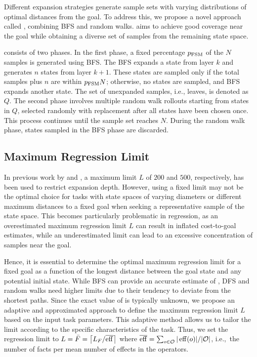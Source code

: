 \documentclass[ppgc,diss,english]{iiufrgs}
\providecommand{\ceil}[1]{\ensuremath{\left\lceil #1\right\rceil}}
\newcommand{\ppi}[2][inline]{\todo[color=purple!50,linecolor={purple!100},#1,fancyline,author=Pedro]{#2}}
\begin{document}
Different expansion strategies generate sample sets with varying distributions of optimal distances from the goal. To address this, we propose a novel approach called \bfsrw, combining BFS and random walks. \bfsrw aims to achieve good coverage near the goal while obtaining a diverse set of samples from the remaining state space.

\bfsrw consists of two phases. In the first phase, a fixed percentage $p_\text{FSM}$ of the $N$ samples is generated using BFS. The BFS expands a state from layer $k$ and generates $n$ states from layer $k+1$. These states are sampled only if the total samples plus $n$ are within $p_{\text{FSM}}N$; otherwise, no states are sampled, and BFS expands another state. The set of unexpanded samples, i.e., leaves, is denoted as $Q$. The second phase involves multiple random walk rollouts starting from states in $Q$, selected randomly with replacement after all states have been chosen once. This process continues until the sample set reaches $N$. During the random walk phase, states sampled in the BFS phase are discarded.

\ppi{Add pseudocode.}

\subsection{Maximum Regression Limit}

In previous work by \citet{Yu.etal/2020} and \citet{OToole/2022}, a maximum limit $L$ of $200$ and $500$, respectively, has been used to restrict expansion depth. However, using a fixed limit may not be the optimal choice for tasks with state spaces of varying diameters or different maximum distances to a fixed goal when seeking a representative sample of the state space. This becomes particularly problematic in regression, as an overestimated maximum regression limit $L$ can result in inflated cost-to-goal estimates, while an underestimated limit can lead to an excessive concentration of samples near the goal.

Hence, it is essential to determine the optimal maximum regression limit for a fixed goal as a function of the longest distance \distfarthest between the goal state and any potential initial state. While BFS can provide an accurate estimate of \distfarthest, DFS and random walks need higher limits due to their tendency to deviate from the shortest paths. Since the exact value of \distfarthest is typically unknown, we propose an adaptive and approximated approach to define the maximum regression limit $L$ based on the input task parameters. This adaptive method allows us to tailor the limit according to the specific characteristics of the task.
Thus, we set the regression limit to $L=\bar F=\ceil{\facts/\overline{\eff}}$ where $\overline{\operatorname{eff}}=\sum_{o\in \mathcal{O}} |\operatorname{eff}(o)|/|\mathcal{O}|$, i.e.,~the number of facts per mean number of effects in the operators.
\end{document}
